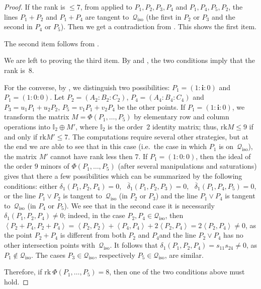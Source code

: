 \documentclass{amsart}
\theoremstyle{plain}
\theoremstyle{definition}
\newcommand{\iso}{\mathcal{Q}_{\mathrm{iso}}}
\newcommand{\scl}[2]{\left\langle {#1}, {#2} \right\rangle}
\newcommand{\iii}{\textbf{i}}
\newcommand{\rk}{\ensuremath{\mathrm{rk}}}
\begin{document}
\begin{proof}
If the rank is $\leq 7$, from
 applied to $P_1, P_2, P_3, P_4$ and $P_1, P_4, P_5, P_2$,
the lines $P_1+P_2$ and $P_1 + P_4$ are tangent to~$\iso$ (the first in $P_2$ or $P_3$ and the second in $P_4$ or $P_5$).
Then we get a contradiction from .
This shows the first item.

The second item follows from .

We are left to proving the third item. By  and , the two conditions imply that the rank is~$8$.

For the converse, by , we distinguish two possibilities:
$P_1 = (1:\iii :0)$ and
$P_1 = (1: 0: 0)$.
Let $P_2 = (A_2: B_2: C_2)$, $P_4 = (A_4: B_4: C_4)$ and
$P_3 = u_1P_1+u_2P_2$, $P_5 = v_1P_1+v_2P_4$ be the other points.
If $P_1 = (1: \iii: 0)$, we transform the matrix $M = \Phi(P_1, \dots, P_5)$ by elementary row and column operations into $\mathbb{I}_2 \oplus M'$, where $\mathbb{I}_2$ is the order~$2$ identity matrix; thus, $\rk M \leq 9$ if and only if $\rk M' \leq 7$.
The computations require several other strategies, but at the end we are
able to see that in this case (i.e.\ the case in which $P_1$ is on~$\iso$), the matrix $M'$ cannot have rank less then $7$.
If $P_1 = (1: 0: 0)$, then the ideal of the order $9$ minors of
$\Phi(P_1, \dots, P_5)$ (after several manipulations and saturations)
gives that there a few possibilities which can be summarized by the
following conditions: either $\delta_1(P_1, P_2, P_4) = 0$,
\ $\overline{\delta}_1(P_1, P_2, P_3) = 0$,
\ $\overline{\delta}_1(P_1, P_4, P_5) = 0$, or the line $P_1 \vee P_2$ is tangent to~$\iso$ (in $P_2$ or $P_3$) and the line $P_1 \vee P_4$ is tangent to~$\iso$ (in $P_4$ or $P_5$). We see that in the second case it is necessarily $\delta_1(P_1,P_2,P_4)
\neq 0$; indeed, in the case $P_2, P_4 \in \iso$, then $\scl{P_2 +P_4}{P_2+P_4}= \scl{P_2}{P_2} + \scl{P_4}{P_4}+2\scl{P_2}{P_4} =2\scl{P_2}{P_4} \neq 0$, as 
the point $P_2 + P_4$ is different from both $P_2$ and $P_4$and the line $P_2 \vee P_4$ has no other intersection points with~$\iso$. It follows that 
$\delta_1 (P_1,P_2,P_4)=s_{11}s_{24} \neq 0$, as $P_1 \not\in \iso$. The cases $P_3 \in \iso$, respectively $P_5\in \iso$, are similar.

Therefore, if $\rk \ \Phi(P_1, \dots, P_5) = 8$, then one of the two conditions above must hold. 
\end{proof}
\end{document}
